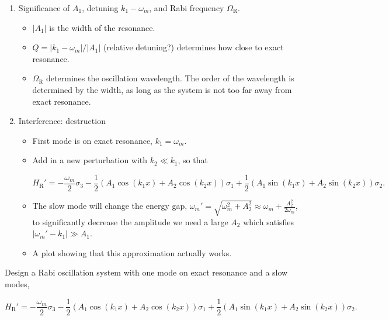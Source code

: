 \documentclass[%
preprint,
 amsmath,amssymb,
 aps,
]{revtex4-1}
\begin{document}
\begin{enumerate}
    \item Significance of $A_1$, detuning $k_1 - \omega_m$, and Rabi frequency $\Omega_{\mathrm R}$.
        \begin{itemize}
            \item $\lvert A_1 \rvert$ is the width of the resonance.
            \item $Q = \lvert k_1 - \omega_m \rvert/\lvert A_1 \rvert$ (relative detuning?) determines how close to exact resonance.
            \item $\Omega_{\mathrm R}$ determines the oscillation wavelength. The order of the wavelength is determined by the width, as long as the system is not too far away from exact resonance.
        \end{itemize}
    \item Interference: destruction
        \begin{itemize}
            \item First mode is on exact resonance,  $k_1 = \omega_m$.
            \item Add in a new perturbation with $k_2\ll k_1$, so that
            
            \begin{equation}
            H_{\mathrm R}' = -\frac{\omega_m}{2} \sigma_3 - \frac{1}{2}( A_1 \cos(k_1 x) + A_2 \cos(k_2 x)) \sigma_1 + \frac{1}{2} ( A_1 \sin(k_1 x) + A_2 \sin(k_2 x)   ) \sigma_2.
            \end{equation}
            
            \item The slow mode will change the energy gap, $\omega_m' = \sqrt{\omega_m^2 + A_2^2} \approx \omega_m + \frac{A_2^2}{2\omega_m}$, to significantly decrease the amplitude we need a large $A_2$ which satisfies $\lvert \omega_m' - k_1 \rvert \gg A_1$.
            \item A plot showing that this approximation actually works.
        \end{itemize}
\end{enumerate}


Design a Rabi oscillation system with one mode on exact resonance and a slow modes,

\begin{equation}
H_{\mathrm R}' = -\frac{\omega_m}{2} \sigma_3 - \frac{1}{2}( A_1 \cos(k_1 x) + A_2 \cos(k_2 x)) \sigma_1 + \frac{1}{2} ( A_1 \sin(k_1 x) + A_2 \sin(k_2 x)   ) \sigma_2.
\end{equation}
\end{document}
